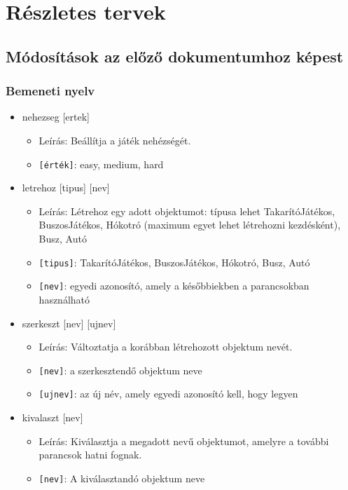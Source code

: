 \chapter{Részletes tervek}
\section{Módosítások az előző dokumentumhoz képest}
\subsection{Bemeneti nyelv}
\begin{itemize}
    \item nehezseg [ertek]
    \begin{itemize}
        \item Leírás: Beállítja a játék nehézségét.
        \item \texttt{[érték]}: easy, medium, hard
    \end{itemize}

    \item letrehoz [tipus] [nev]
    \begin{itemize}
        \item Leírás: Létrehoz egy adott objektumot: típusa lehet TakarítóJátékos, BuszosJátékos, Hókotró (maximum egyet lehet létrehozni kezdésként), Busz, Autó
        \item \texttt{[tipus]}: TakarítóJátékos, BuszosJátékos, Hókotró, Busz, Autó
        \item \texttt{[nev]}: egyedi azonosító, amely a későbbiekben a parancsokban használható
    \end{itemize}

    \item szerkeszt [nev] [ujnev] 
    \begin{itemize}
        \item Leírás: Változtatja a korábban létrehozott objektum nevét.
        \item \texttt{[nev]}: a szerkesztendő objektum neve
        \item \texttt{[ujnev]}: az új név, amely egyedi azonosító kell, hogy legyen
    \end{itemize}

    \item kivalaszt [nev]
    \begin{itemize}
        \item Leírás: Kiválasztja a megadott nevű objektumot, amelyre a további parancsok hatni fognak.
        \item \texttt{[nev]}: A kiválasztandó objektum neve
    \end{itemize}


\end{itemize}
